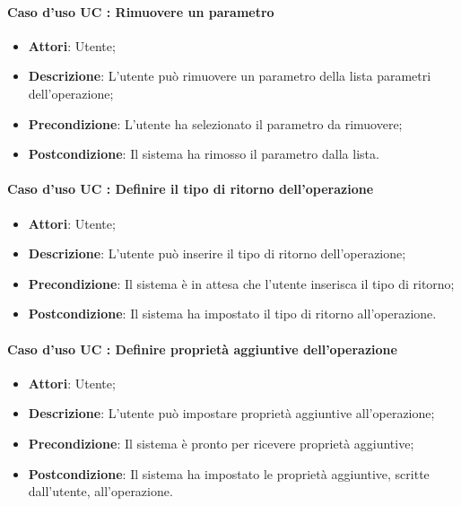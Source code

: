 \documentclass[../AnalisiDeiRequisiti.tex]{subfiles}
\begin{document}
		\paragraph{Caso d'uso UC : Rimuovere un parametro}
			\begin{itemize}
				\item \textbf{Attori}: Utente;
				\item \textbf{Descrizione}: L'utente può rimuovere un parametro della lista
				parametri dell'operazione;
				\item \textbf{Precondizione}: L'utente ha selezionato il parametro da
				rimuovere;
				\item \textbf{Postcondizione}: Il sistema ha rimosso il parametro dalla lista.
			\end{itemize}
		\paragraph{Caso d'uso UC : Definire il tipo di ritorno dell'operazione}
			\begin{itemize}
				\item \textbf{Attori}: Utente;
				\item \textbf{Descrizione}: L'utente può inserire il tipo di ritorno
				dell'operazione;
				\item \textbf{Precondizione}: Il sistema è in attesa che l'utente inserisca
				il tipo di ritorno;
				\item \textbf{Postcondizione}: Il sistema ha impostato il tipo di ritorno
				all'operazione.
			\end{itemize}
		\paragraph{Caso d'uso UC : Definire proprietà aggiuntive dell'operazione}
			\begin{itemize}
				\item \textbf{Attori}: Utente;
				\item \textbf{Descrizione}: L'utente può impostare proprietà aggiuntive
				all'operazione;
				\item \textbf{Precondizione}: Il sistema è pronto per ricevere proprietà
				aggiuntive;
				\item \textbf{Postcondizione}: Il sistema ha impostato le proprietà
				aggiuntive, scritte dall'utente, all'operazione.
			\end{itemize}
\end{document}
